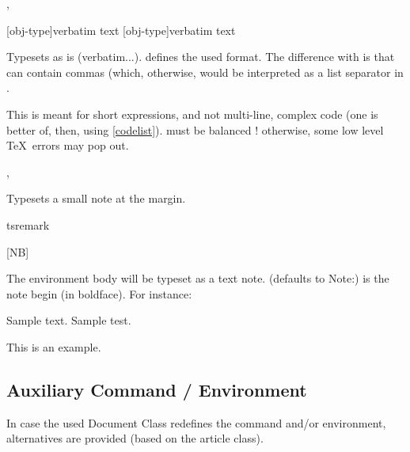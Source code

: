 \documentclass{article}
\begin{document}
\begin{codedescribe}[code]{\typesetverb,\tsverb}
\begin{codesyntax}
\tsmacro{\typesetverb}[obj-type]{verbatim text}
\tsmacro{\tsverb}[obj-type]{verbatim text}
\end{codesyntax}
 Typesets  as is (verbatim...).  defines the used format. The difference with  is that  can contain commas (which, otherwise, would be interpreted as a list separator in \tsobj{\tsobj}.
\end{codedescribe}
\begin{tsremark}
This is meant for short expressions, and not multi-line, complex code (one is better of, then, using \ref{codelist}).   must be balanced ! otherwise, some low level \TeX\ errors may pop out.
\end{tsremark}


\begin{codedescribe}[code]{\typesetmarginnote,\tsmarginnote}
\begin{codesyntax}
\end{codesyntax}
Typesets a small note at the margin.
\end{codedescribe}

\begin{codedescribe}[env]{tsremark}
\begin{codesyntax}
\tsmacro{\begin{tsremark}}[NB]{}
\tsmacro{\end{tsremark}}{}
\end{codesyntax}
 The environment body will be typeset as a text note.  (defaults to Note:) is the note begin (in boldface). For instance:
 \begin{codestore}
 Sample text. Sample test.
  \begin{tsremark}[N.B.]
    This is an example.
  \end{tsremark}
 \end{codestore}
\end{codedescribe}

\subsection{Auxiliary Command / Environment}
In case the used Document Class redefines the \tsobj[code]{\maketitle} command and/or  environment, alternatives are provided (based on the article class).
\end{document}
